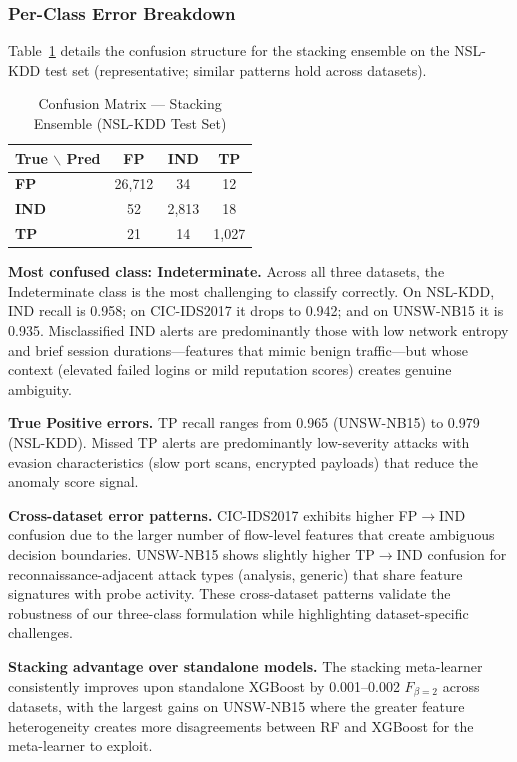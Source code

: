 \documentclass[conference]{IEEEtran}
\begin{document}
\subsubsection{Per-Class Error Breakdown}
Table~\ref{tab:error_detail} details the confusion structure for the stacking ensemble
on the NSL-KDD test set (representative; similar patterns hold across datasets).

\begin{table}[t]
\centering
\caption{Confusion Matrix --- Stacking Ensemble (NSL-KDD Test Set)}
\label{tab:error_detail}
\renewcommand{\arraystretch}{1.05}
\begin{tabular}{l|ccc}
\toprule
\textbf{True $\backslash$ Pred} & \textbf{FP} & \textbf{IND} & \textbf{TP} \\
\midrule
\textbf{FP}  & 26{,}712 & 34   & 12  \\
\textbf{IND} &  52      & 2{,}813 & 18  \\
\textbf{TP}  &  21      & 14   & 1{,}027 \\
\bottomrule
\end{tabular}
\end{table}

\textbf{Most confused class: Indeterminate.}
Across all three datasets, the Indeterminate class is the most challenging
to classify correctly. On NSL-KDD, IND recall is 0.958; on CIC-IDS2017 it
drops to 0.942; and on UNSW-NB15 it is 0.935. Misclassified IND alerts
are predominantly those with low network entropy and brief session
durations---features that mimic benign traffic---but whose context
(elevated failed logins or mild reputation scores) creates genuine ambiguity.

\textbf{True Positive errors.}
TP recall ranges from 0.965 (UNSW-NB15) to 0.979 (NSL-KDD).
Missed TP alerts are predominantly low-severity attacks with evasion
characteristics (slow port scans, encrypted payloads) that reduce the
anomaly score signal.

\textbf{Cross-dataset error patterns.}
CIC-IDS2017 exhibits higher FP$\to$IND confusion due to the larger number
of flow-level features that create ambiguous decision boundaries.
UNSW-NB15 shows slightly higher TP$\to$IND confusion for reconnaissance-adjacent
attack types (analysis, generic) that share feature signatures with probe activity.
These cross-dataset patterns validate the robustness of our three-class formulation
while highlighting dataset-specific challenges.

\textbf{Stacking advantage over standalone models.}
The stacking meta-learner consistently improves upon standalone XGBoost by
0.001--0.002 $F_{\beta=2}$ across datasets, with the largest gains on
UNSW-NB15 where the greater feature heterogeneity creates more disagreements
between RF and XGBoost for the meta-learner to exploit.
\end{document}
